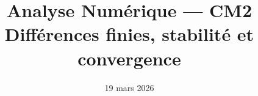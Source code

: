 


\newcommand{\atrou}[2][3cm]{%
  \ifthenelse{\boolean{showSolutions}}{%
    \par\vspace{0.5em}%
    \begin{mdframed}[backgroundcolor=ThemeLight, linewidth=0pt,
      skipabove=0pt, skipbelow=0pt,
      innertopmargin=8pt, innerbottommargin=8pt]%
    #2%
    \end{mdframed}%
    \par\vspace{0.5em}%
  }{%
    \par\vspace{0.5em}%
    \noindent\fbox{\begin{minipage}[c][#1]%
      {\dimexpr\textwidth-2\fboxsep-2\fboxrule\relax}%
      \color{white}\rule{0pt}{0pt}%
    \end{minipage}}%
    \par\vspace{0.5em}%
  }%
}

\newcommand{\val}[1]{%
  \ifthenelse{\boolean{showSolutions}}{#1}{\phantom{#1}}%
}

\newcommand{\esquisse}[1][5.5cm]{%
  \begin{center}%
  \ifthenelse{\boolean{showSolutions}}{%
    \fbox{\begin{minipage}[c][#1]{0.85\textwidth}%
      \centering\vfill
      \textit{\small Croquis réalisé en cours.}%
      \vfill
    \end{minipage}}%
  }{%
    \fbox{\begin{minipage}[c][#1]{0.85\textwidth}%
      \hfill\vfill\hfill
    \end{minipage}}%
  }%
  \end{center}%
}

\newcommand{\degC}{\text{\textdegree C}}

\title{\sffamily\bfseries Analyse Numérique --- CM2\\[0.3em]
  \Large Différences finies, stabilité et convergence}
\author{}
\date{19 mars 2026}


\sffamily
\maketitle
\thispagestyle{empty}

